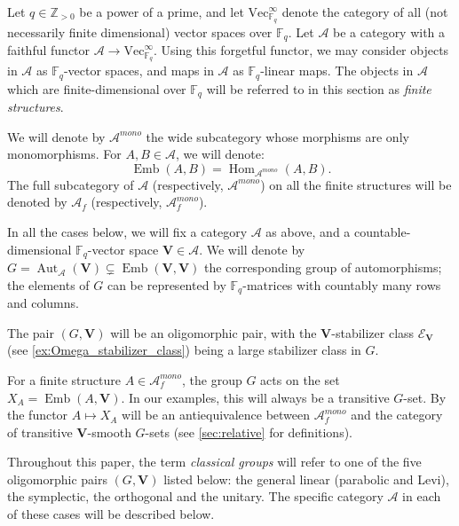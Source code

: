 \documentclass[11pt,a4paper]{amsart}
\theoremstyle{plain}%
\theoremstyle{definition}
\theoremstyle{remark}
\newcommand{\Hom}{\operatorname{Hom}}
\newcommand{\Aut}{{\operatorname{Aut}}}
\newcommand{\Z}{{\mathbb Z}}
\newcommand{\V}{\mathbf{V}}
\newcommand{\F}{{\mathbb F}}
\newcommand{\Emb}{\operatorname{Emb}}
\begin{document}
Let $q\in \Z_{>0}$ be a power of a prime, 
and let $\mathrm{Vec}^{{\infty}}_{\F_q}$ denote the category of all ({not} necessarily finite dimensional) vector spaces over $\F_q$. Let $\mathcal{A}$ be a category with a faithful functor $\mathcal{A}\to \mathrm{Vec}^{{\infty}}_{\F_q}$. Using this forgetful functor, we may consider objects in $\mathcal{A}$ as $\F_q$-vector spaces, and maps in $\mathcal{A}$ as $\F_q$-linear maps. The objects in $\mathcal{A}$ which are finite-dimensional over $\F_q$ will be referred to in this section as \emph{finite structures}. 

We will denote by $\mathcal{A}^{mono}$ the wide subcategory whose morphisms are only monomorphisms. For $A, B\in \mathcal{A}$, we will denote: $$\Emb(A, B)=\Hom_{\mathcal{A}^{mono}}(A, B).$$ 
The full subcategory of $\mathcal{A}$ (respectively, $\mathcal{A}^{mono}$) on all the finite structures will be denoted by $\mathcal{A}_f$ (respectively, $\mathcal{A}^{mono}_f
$).

In all the cases below, we will fix a category $\mathcal{A}$ as above, and a countable-dimensional $\F_q$-vector space $\V \in \mathcal{A}$.
We will denote by $G=\Aut_{\mathcal{A}}(\V) {\subsetneq} \Emb(\V, \V)$ the corresponding group of automorphisms; the elements of $G$ can be represented by $\F_q$-matrices with countably many rows and columns. 





\medskip

The pair $(G, \V)$ will be an oligomorphic pair, with the $\V$-stabilizer class $\mathcal{E}_\V$ (see \cref{ex:Omega_stabilizer_class}) being a large stabilizer class in $G$. 

For a finite structure $A \in \mathcal{A}^{mono}_f$, the group $G$ acts on the set $X_A=\Emb(A, \V)$. In our examples, this will always be a transitive $G$-set. By \cite[Proposition 2.7]{HS-classical} the functor $ A \mapsto X_A$ will be an antiequivalence between $\mathcal{A}^{mono}_f$ and the category of transitive $\V$-smooth $G$-sets (see \cref{sec:relative} for definitions). 




Throughout this paper, the term \emph{classical groups} will refer to one of the five oligomorphic pairs $(G, \V)$ listed below: the general linear {(parabolic and Levi)}, the symplectic, the orthogonal and the unitary. The specific category $\mathcal{A}$ in each of these cases will be described below.

\medskip
\end{document}
